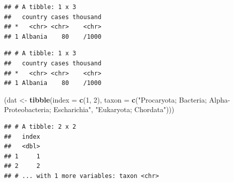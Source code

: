 \documentclass[]{book}
\newenvironment{Shaded}{\begin{snugshade}}{\end{snugshade}}
\newcommand{\KeywordTok}[1]{\textcolor[rgb]{0.13,0.29,0.53}{\textbf{#1}}}
\newcommand{\DataTypeTok}[1]{\textcolor[rgb]{0.13,0.29,0.53}{#1}}
\newcommand{\DecValTok}[1]{\textcolor[rgb]{0.00,0.00,0.81}{#1}}
\newcommand{\StringTok}[1]{\textcolor[rgb]{0.31,0.60,0.02}{#1}}
\newcommand{\OperatorTok}[1]{\textcolor[rgb]{0.81,0.36,0.00}{\textbf{#1}}}
\newcommand{\NormalTok}[1]{#1}
\begin{document}
\begin{verbatim}
## # A tibble: 1 x 3
##   country cases thousand
## *   <chr> <chr>    <chr>
## 1 Albania    80    /1000
\end{verbatim}

\begin{Shaded}
\end{Shaded}

\begin{verbatim}
## # A tibble: 1 x 3
##   country cases thousand
## *   <chr> <chr>    <chr>
## 1 Albania    80    /1000
\end{verbatim}

\begin{Shaded}
\begin{Highlighting}[]
\NormalTok{(dat <-}\StringTok{ }\KeywordTok{tibble}\NormalTok{(}\DataTypeTok{index =} \KeywordTok{c}\NormalTok{(}\DecValTok{1}\NormalTok{, }\DecValTok{2}\NormalTok{), }
               \DataTypeTok{taxon =} \KeywordTok{c}\NormalTok{(}\StringTok{"Procaryota; Bacteria; Alpha-Proteobacteria; Escharichia"}\NormalTok{, }\StringTok{"Eukaryota; Chordata"}\NormalTok{)))}
\end{Highlighting}
\end{Shaded}

\begin{verbatim}
## # A tibble: 2 x 2
##   index
##   <dbl>
## 1     1
## 2     2
## # ... with 1 more variables: taxon <chr>
\end{verbatim}

\begin{Shaded}
\end{Shaded}
\end{document}
